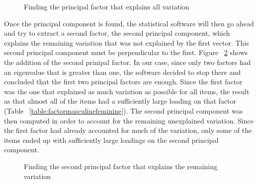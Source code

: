 \documentclass[a4paper,12pt,oneside]{book}
\begin{document}
\begin{figure}[!h]
\centering
{} 
\caption{Finding the principal factor that explains all variation}
\label{figure:principalfactor}
\end{figure}

Once the principal component is found, the statistical software will then go ahead and try to extract a second factor, the second principal component,
which explains the remaining variation that was not explained by the first vector. This second principal component must be perpendicular to the first.
Figure ~\ref{figure:secondprincipalfactor} shows the addition of the second prinipal factor. In our case, since only two factors had an eigenvalue that
is greater than one, the software decided to stop there and concluded that the first two principal factors are enough. Since the first factor was
the one that explained as much variation as possible for all items, the result as that almost all of the items had a sufficiently large loading
on that factor (Table ~\ref{table:factormasculinefeminine}). The second principal component was then computed in order to account for the remaining
unexplained variation. Since the first factor had already accounted for much of the variation, only some of the items ended up with sufficiently
large loadings on the second principal component. 

\begin{figure}[!h]
\centering
{} 
\caption{Finding the second principal factor that explains the remaining variation}
\label{figure:secondprincipalfactor}
\end{figure}
\end{document}
